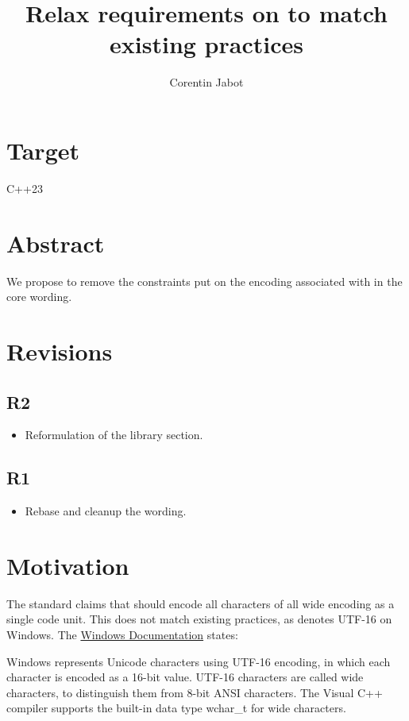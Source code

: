 \documentclass{wg21}
\title{Relax requirements on \tcode{wchar\_t} to match existing practices}
\author{Corentin Jabot}{corentin.jabot@gmail.com}
\begin{document}
\maketitle

\section{Target}

C++23

\section{Abstract}

We propose to remove the constraints put on the encoding associated with  in the core wording.


\section{Revisions}

\subsection{R2}
\begin{itemize}
\item Reformulation of the library section.
\end{itemize}

\subsection{R1}
\begin{itemize}
\item Rebase and cleanup the wording.
\end{itemize}

\section{Motivation}

The standard claims that  should encode all characters of all wide encoding
as a single code unit.
This does not match existing practices, as  denotes UTF-16 on Windows.
The \href{https://docs.microsoft.com/en-us/windows/win32/learnwin32/working-with-strings}{Windows Documentation} states:

\begin{quoteblock}
Windows represents Unicode characters using UTF-16 encoding, in which each character is encoded as a 16-bit value. UTF-16 characters are called wide characters, to distinguish them from 8-bit ANSI characters. The Visual C++ compiler supports the built-in data type wchar_t for wide characters.
\end{quoteblock}
\end{document}
